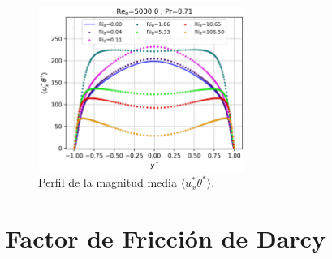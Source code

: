 
\begin{figure}[H] %
  \centering
  \includegraphics[width=0.6\textwidth]{figures/cap5/Re5000-Pr071/uxphi_profile.png}  
  \caption{Perfil de la magnitud media $\langle u^{*}_x\theta^{*}\rangle$.}
  \label{fig:uphi-Re5000-Pr071}
\end{figure}

\newpage
\section{Factor de Fricción de Darcy}

